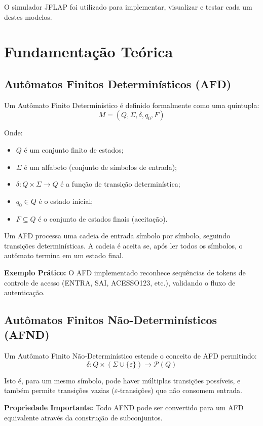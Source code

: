 \documentclass[12pt,a4paper]{article}
\begin{document}
O simulador JFLAP foi utilizado para implementar, visualizar e testar cada um destes modelos.

\newpage

\section{Fundamentação Teórica}

\subsection{Autômatos Finitos Determinísticos (AFD)}

Um Autômato Finito Determinístico é definido formalmente como uma quíntupla:
\[ M = (Q, \Sigma, \delta, q_0, F) \]

Onde:
\begin{itemize}
    \item $Q$ é um conjunto finito de estados;
    \item $\Sigma$ é um alfabeto (conjunto de símbolos de entrada);
    \item $\delta: Q \times \Sigma \rightarrow Q$ é a função de transição determinística;
    \item $q_0 \in Q$ é o estado inicial;
    \item $F \subseteq Q$ é o conjunto de estados finais (aceitação).
\end{itemize}

Um AFD processa uma cadeia de entrada símbolo por símbolo, seguindo transições determinísticas. A cadeia é aceita se, após ler todos os símbolos, o autômato termina em um estado final.

\textbf{Exemplo Prático:} O AFD implementado reconhece sequências de tokens de controle de acesso (ENTRA, SAI, ACESSO123, etc.), validando o fluxo de autenticação.

\subsection{Autômatos Finitos Não-Determinísticos (AFND)}

Um Autômato Finito Não-Determinístico estende o conceito de AFD permitindo:
\[ \delta: Q \times (\Sigma \cup \{\varepsilon\}) \rightarrow \mathcal{P}(Q) \]

Isto é, para um mesmo símbolo, pode haver múltiplas transições possíveis, e também permite transições vazias ($\varepsilon$-transições) que não consomem entrada.

\textbf{Propriedade Importante:} Todo AFND pode ser convertido para um AFD equivalente através da construção de subconjuntos.
\end{document}
